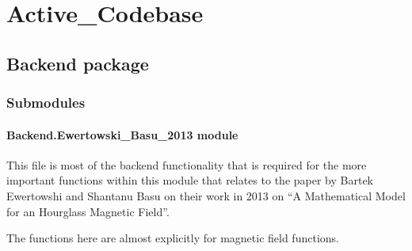 \documentclass[letterpaper,10pt,english]{sphinxmanual}
\begin{document}
\chapter{Active\_Codebase}
\label{\detokenize{modules:active-codebase}}\label{\detokenize{modules::doc}}

\section{Backend package}
\label{\detokenize{Backend:backend-package}}\label{\detokenize{Backend::doc}}

\subsection{Submodules}
\label{\detokenize{Backend:submodules}}

\subsubsection{Backend.Ewertowski\_Basu\_2013 module}
\label{\detokenize{Backend.Ewertowski_Basu_2013:module-Backend.Ewertowski_Basu_2013}}\label{\detokenize{Backend.Ewertowski_Basu_2013:backend-ewertowski-basu-2013-module}}\label{\detokenize{Backend.Ewertowski_Basu_2013::doc}}
This file is most of the backend functionality that is required for the
more important functions within this module that relates to the paper by
Bartek Ewertowshi and Shantanu Basu on their work in 2013 on “A Mathematical
Model for an Hourglass Magnetic Field”.

The functions here are almost explicitly for magnetic field functions.
\end{document}
